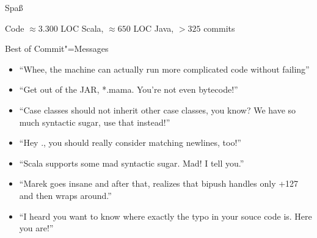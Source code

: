 \documentclass[hyperref={pdfpagelabels=false}]{beamer}
\begin{document}
\begin{frame}{Spaß}
  \begin{block}{Code}
    $\approx 3.300$ LOC Scala, $\approx 650$ LOC Java, $> 325$ commits
  \end{block}
  \begin{block}{Best of Commit"=Messages}\footnotesize
    \begin{itemize}
      \item \enquote{Whee, the machine can actually run more complicated code without failing}
      \item \enquote{Get out of the JAR, *.mama. You're not even bytecode!}
      \item \enquote{Case classes should not inherit other case classes, you know? We have so much syntactic sugar, use that instead!}
      \item \enquote{Hey ., you should really consider matching newlines, too!}
      \item \enquote{Scala supports some mad syntactic sugar. Mad! I tell you.}
      \item \enquote{Marek goes insane and after that, realizes that bipush handles only +127 and then wraps around.}
      \item \enquote{I heard you want to know where exactly the typo in your souce code is. Here you are!}
    \end{itemize}
  \end{block}
\end{frame}
\end{document}
